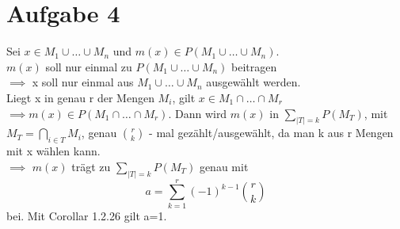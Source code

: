 \documentclass[a4paper]{scrartcl}
\begin{document}
\section*{Aufgabe 4}
Sei $x \in M_1 \cup \dots \cup M_n$ und $m(x) \in P(M_1 \cup \dots \cup M_n)$.\\ $m(x)$ soll nur einmal zu $P(M_1 \cup \dots \cup M_n)$ beitragen\\ $\implies$ x soll nur einmal aus $M_1 \cup \dots \cup M_n$ ausgewählt werden.\\
Liegt x in genau r der Mengen $M_i$, gilt $x \in M_1 \cap \dots \cap M_r$\\ $\implies m(x) \in P(M_1 \cap \dots \cap M_r)$.
Dann wird $m(x)$ in $\sum_{|T| = k} P(M_T)$, mit $M_T = \bigcap_{i \in T} M_i$, genau $\binom{r}{k}$ - mal gezählt/ausgewählt, da man k aus r Mengen mit x wählen kann.\\
$\implies$ $m(x)$ trägt zu $\sum_{|T| = k}P(M_T)$ genau mit 
\begin{equation}
	a = \sum_{k=1}^{r} (-1)^{k-1}\binom{r}{k}
\end{equation}
bei. Mit Corollar 1.2.26 gilt a=1.\\
\end{document}
